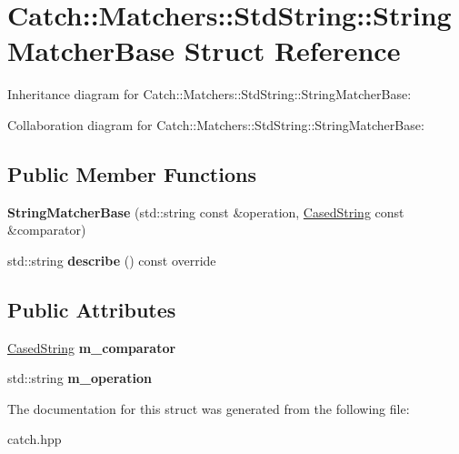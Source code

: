\hypertarget{structCatch_1_1Matchers_1_1StdString_1_1StringMatcherBase}{}\section{Catch\+:\+:Matchers\+:\+:Std\+String\+:\+:String\+Matcher\+Base Struct Reference}
\label{structCatch_1_1Matchers_1_1StdString_1_1StringMatcherBase}


Inheritance diagram for Catch\+:\+:Matchers\+:\+:Std\+String\+:\+:String\+Matcher\+Base\+:


Collaboration diagram for Catch\+:\+:Matchers\+:\+:Std\+String\+:\+:String\+Matcher\+Base\+:
\subsection*{Public Member Functions}
\begin{DoxyCompactItemize}
\item 
{\bfseries String\+Matcher\+Base} (std\+::string const \&operation, \hyperlink{structCatch_1_1Matchers_1_1StdString_1_1CasedString}{Cased\+String} const \&comparator)\hypertarget{structCatch_1_1Matchers_1_1StdString_1_1StringMatcherBase_a3a9b66bae298ae27058478529b4bb39d}{}\label{structCatch_1_1Matchers_1_1StdString_1_1StringMatcherBase_a3a9b66bae298ae27058478529b4bb39d}

\item 
std\+::string {\bfseries describe} () const override\hypertarget{structCatch_1_1Matchers_1_1StdString_1_1StringMatcherBase_a47af030f8cea42a601ffb1000eea5cca}{}\label{structCatch_1_1Matchers_1_1StdString_1_1StringMatcherBase_a47af030f8cea42a601ffb1000eea5cca}

\end{DoxyCompactItemize}
\subsection*{Public Attributes}
\begin{DoxyCompactItemize}
\item 
\hyperlink{structCatch_1_1Matchers_1_1StdString_1_1CasedString}{Cased\+String} {\bfseries m\+\_\+comparator}\hypertarget{structCatch_1_1Matchers_1_1StdString_1_1StringMatcherBase_a17c9f0fe40587070ffe998c193742831}{}\label{structCatch_1_1Matchers_1_1StdString_1_1StringMatcherBase_a17c9f0fe40587070ffe998c193742831}

\item 
std\+::string {\bfseries m\+\_\+operation}\hypertarget{structCatch_1_1Matchers_1_1StdString_1_1StringMatcherBase_a7a25c4b7d863e9a1c406d81efd0f83ca}{}\label{structCatch_1_1Matchers_1_1StdString_1_1StringMatcherBase_a7a25c4b7d863e9a1c406d81efd0f83ca}

\end{DoxyCompactItemize}


The documentation for this struct was generated from the following file\+:\begin{DoxyCompactItemize}
\item 
catch.\+hpp\end{DoxyCompactItemize}
